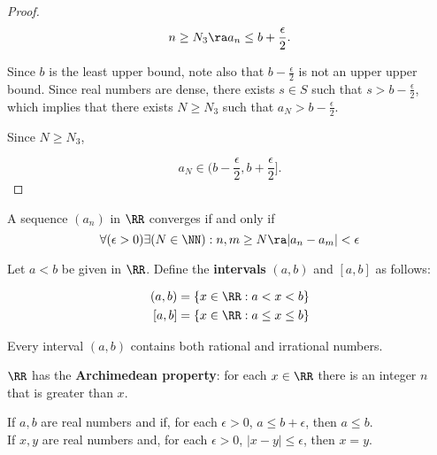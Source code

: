 \documentclass[11pt]{scrartcl}
\begin{document}
\begin{proof}
  \[n\geq N_{3} \ra a_{n}\leq b + \frac{\epsilon}{2}.\]  \vv

  Since \(b\) is the least upper bound, note also that
  \(b-\frac{\epsilon}{2}\) is not an upper upper bound. Since real
  numbers are dense, there exists \(s\in S\) such that
  \(s> b- \frac{\epsilon}{2}\), which implies that there exists
  \(N\geq N_{3}\) such that \(a_{N}>b-\frac{\epsilon}{2}\).

  Since \(N\geq N_{3}\),

  \[a_{N}\in(b-\frac{\epsilon}{2}, b+\frac{\epsilon}{2}].\]

  
  
\end{proof}
\begin{theorem}
  A sequence $(a_n)$ in $\RR$ converges if and only if
  \[ \forall(\epsilon > 0)\exists(N\in\NN): n,m \geq N \ra |a_n-a_m|<\epsilon \]
\end{theorem}
\begin{definition}
  Let $a<b$ be given in $\RR$. Define the \textbf{intervals} $(a,b)$
  and $[a,b]$ as follows:

  \begin{align}
    (a,b) &= \{x\in\RR: a<x<b \}\\
    [a,b] &= \{x\in\RR: a\leq x\leq b \}
  \end{align}
\end{definition}

\begin{theorem}
Every interval $(a,b)$ contains both rational and irrational numbers.
\end{theorem}
\begin{lemma}
  $\RR$ has the \textbf{Archimedean property}: for each $x\in \RR$
  there is an integer $n$ that is greater than $x$.
\end{lemma}
\begin{theorem}
  If $a,b$ are real numbers and if, for each $\epsilon > 0$,
  $a \leq b + \epsilon$, then $a\leq b$.\\ If $x, y$ are real numbers and, for each $\epsilon>0$,
  $|x-y|\leq \epsilon$, then $x=y$.
\end{theorem}
\end{document}

